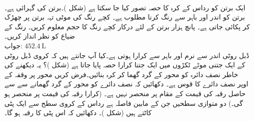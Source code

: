 \\
ایک برتن کو رداس  کے کرہ کا حصہ تصور کیا جا سکتا ہے (شکل )۔برتن کی گہرائی  ہے۔برتن کو اندر اور باہر سے رنگ کرنا مطلوب ہے۔ کچے رنگ کی  موٹی تہہ برتن پر چھڑک کر پکائی جاتی ہے۔ پانچ ہزار برتن کے لئے درکار کچے رنگ کا حجم معلوم کریں۔ رنگ کے ضیاع کو نظر انداز کریں۔\\
جواب:\quad
$\SI{452.4}{\liter}$
\\
ڈبل روٹی اندر سے نرم اور باہر سے کرارا ہوتی ہے۔کیا آپ جانتے ہیں کہ کروی ڈبل روٹی کے ایک جتنی موٹے ٹکڑوں میں  ایک جتنا کرارا حصہ پایا جاتا ہے (شکل )؟ یہ دیکھنے کی خاطر نصف دائرہ  کو  محور کے گرد گھما کر کرہ بنائیں۔فرض کریں محور  پر وقفہ  کے اوپر نصف دائرے کا قوس  ہے۔ دکھائیں کہ نصف دائرے کو  محور کے گرد گھمانے سے  سے حاصل رقبہ  کی قیمت  کے مقام پر منحصر نہیں ہے۔ (کرارا رقبہ کی قیمت  پر منحصر ہو گی۔)
دو متوازی سطحیں جن کے مابین فاصلہ  ہے رداس  کے کروی سطح سے ایک پٹی کاٹتے ہیں (شکل )۔ دکھائیں کہ اس پٹی کا رقبہ  ہو گا۔   
